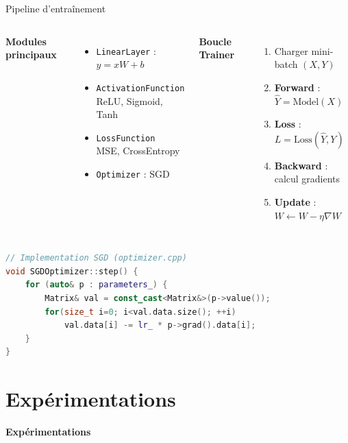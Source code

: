 \documentclass[aspectratio=169,xcolor=dvipsnames]{beamer}
\begin{document}
\begin{frame}[fragile]{Pipeline d'entraînement}
\begin{columns}[T]
{\small
\textbf{Modules principaux}
\begin{itemize}
    \item \texttt{LinearLayer} : $y = xW + b$
    \item \texttt{ActivationFunction}\\
    ReLU, Sigmoid, Tanh
    \item \texttt{LossFunction}\\
    MSE, CrossEntropy
    \item \texttt{Optimizer} : SGD
\end{itemize}
}

{\small
\textbf{Boucle Trainer}
\begin{enumerate}
    \item Charger mini-batch $(X, Y)$
    \item \textbf{Forward} : $\hat{Y} = \text{Model}(X)$
    \item \textbf{Loss} : $L = \text{Loss}(\hat{Y}, Y)$
    \item \textbf{Backward} : calcul gradients
    \item \textbf{Update} : $W \leftarrow W - \eta \nabla W$
\end{enumerate}
}
\end{columns}

\vspace{0.15cm}

\begin{lstlisting}[language=C++]
// Implementation SGD (optimizer.cpp)
void SGDOptimizer::step() {
    for (auto& p : parameters_) {
        Matrix& val = const_cast<Matrix&>(p->value());
        for(size_t i=0; i<val.data.size(); ++i)
            val.data[i] -= lr_ * p->grad().data[i];
    }
}
\end{lstlisting}
\end{frame}



\section{Expérimentations}
\begin{frame}
    \centering
    \Huge \textbf{Expérimentations}
\end{frame}
\end{document}
